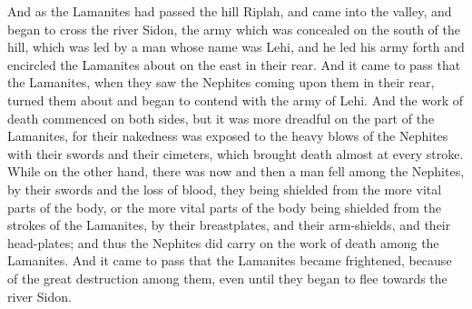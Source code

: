 And as the Lamanites had passed the hill Riplah, and came into the valley, and began to cross the river Sidon, the army which was concealed on the south of the hill, which was led by a man whose name was Lehi, and he led his army forth and encircled the Lamanites about on the east in their rear.
\bverse \iffalse And it came to pass that the Lamanites, when they saw the Nephites coming upon them in their rear, turned them about and began to contend with the army of Lehi. \fi
And it came to pass that the Lamanites, when they saw the Nephites coming upon them in their rear, turned them about and began to contend with the army of Lehi.
\bverse \iffalse And the work of death commenced on both sides, but it was more dreadful on the part of the Lamanites, for their nakedness was exposed to the heavy blows of the Nephites with their swords and their cimeters, which brought death almost at every stroke. \fi
And the work of death commenced on both sides, but it was more dreadful on the part of the Lamanites, for their nakedness was exposed to the heavy blows of the Nephites with their swords and their cimeters, which brought death almost at every stroke.
\bverse \iffalse While on the other hand, there was now and then a man fell among the Nephites, by their swords and the loss of blood, they being shielded from the more vital parts of the body, or the more vital parts of the body being shielded from the strokes of the Lamanites, by their breastplates, and their arm-shields, and their head-plates; and thus the Nephites did carry on the work of death among the Lamanites. \fi
While on the other hand, there was now and then a man fell among the Nephites, by their swords and the loss of blood, they being shielded from the more vital parts of the body, or the more vital parts of the body being shielded from the strokes of the Lamanites, by their breastplates, and their arm-shields, and their head-plates; and thus the Nephites did carry on the work of death among the Lamanites.
\bverse \iffalse And it came to pass that the Lamanites became frightened, because of the great destruction among them, even until they began to flee towards the river Sidon. \fi
And it came to pass that the Lamanites became frightened, because of the great destruction among them, even until they began to flee towards the river Sidon.
\bverse \iffalse And they were pursued by Lehi and his men; and they were driven by Lehi into the waters of Sidon, and they crossed the waters of Sidon. And Lehi retained his armies upon the bank of the river Sidon that they should not cross. \fi
